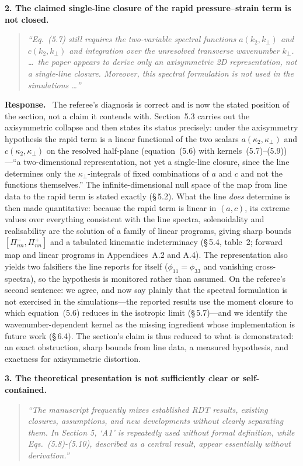 \documentclass[11pt]{article}
\newenvironment{refcomment}%
  {\begin{quote}\color{commentgray}\itshape}%
  {\end{quote}}
\newcommand{\response}{\medskip\noindent\textbf{Response.}\ }
\newcommand{\point}[1]{\bigskip\noindent\textbf{#1}}
\begin{document}
\point{2. The claimed single-line closure of the rapid pressure--strain
term is not closed.}
\begin{refcomment}
``Eq.\ (5.7) still requires the two-variable spectral functions
$a(k_2,k_\perp)$ and $c(k_2,k_\perp)$ and integration over the unresolved
transverse wavenumber $k_\perp$. \ldots\ the paper appears to derive only
an axisymmetric 2D representation, not a single-line closure. Moreover,
this spectral formulation is not used in the simulations \ldots''
\end{refcomment}

\response
The referee's diagnosis is correct and is now the stated position of the
section, not a claim it contends with. Section~5.3 carries out the
axisymmetric collapse and then states its status precisely: under the
axisymmetry hypothesis the rapid term is a linear functional of the two
scalars $a(\kappa_2,\kappa_\perp)$ and $c(\kappa_2,\kappa_\perp)$ on the
resolved half-plane (equation~(5.6) with kernels~(5.7)--(5.9))---``a
two-dimensional representation, not yet a single-line closure, since the
line determines only the $\kappa_\perp$-integrals of fixed combinations of
$a$ and $c$ and not the functions themselves.'' The infinite-dimensional
null space of the map from line data to the rapid term is stated exactly
(\S\,5.2). What the line \emph{does} determine is then made quantitative:
because the rapid term is linear in $(a,c)$, its extreme values over
everything consistent with the line spectra, solenoidality and
realisability are the solution of a family of linear programs, giving sharp
bounds $[\Pi^-_{nn},\Pi^+_{nn}]$ and a tabulated kinematic indeterminacy
(\S\,5.4, table~2; forward map and linear programs in Appendices~A.2 and
A.4). The representation also yields two falsifiers the line reports for
itself ($\phi_{11}=\phi_{33}$ and vanishing cross-spectra), so the
hypothesis is monitored rather than assumed. On the referee's second
sentence: we agree, and now say plainly that the spectral formulation is
not exercised in the simulations---the reported results use the moment
closure to which equation~(5.6) reduces in the isotropic limit
(\S\,5.7)---and we identify the wavenumber-dependent kernel as the missing
ingredient whose implementation is future work (\S\,6.4). The section's
claim is thus reduced to what is demonstrated: an exact obstruction, sharp
bounds from line data, a measured hypothesis, and exactness for
axisymmetric distortion.

\point{3. The theoretical presentation is not sufficiently clear or
self-contained.}
\begin{refcomment}
``The manuscript frequently mixes established RDT results, existing
closures, assumptions, and new developments without clearly separating
them. In Section 5, `A1' is repeatedly used without formal definition,
while Eqs.\ (5.8)-(5.10), described as a central result, appear essentially
without derivation.''
\end{refcomment}
\end{document}
